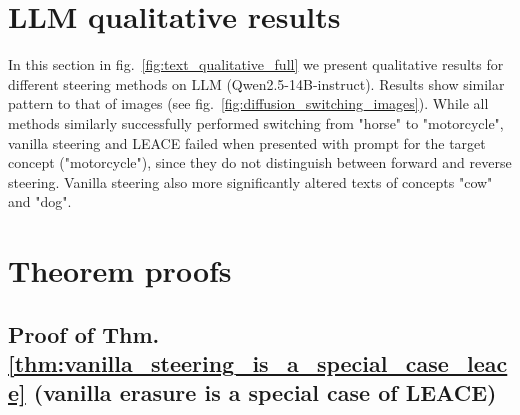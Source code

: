 \clearpage
\section{LLM qualitative results}
In this section in fig.~\ref{fig:text_qualitative_full} we present qualitative results for different steering methods on LLM (Qwen2.5-14B-instruct). Results show similar pattern to that of images (see fig.~\ref{fig:diffusion_switching_images}). While all methods similarly successfully performed switching from "horse" to "motorcycle", vanilla steering and LEACE failed when presented with prompt for the target concept ("motorcycle"), since they do not distinguish between forward and reverse steering. Vanilla steering also more significantly altered texts of concepts "cow" and "dog". 


\clearpage
\section{Theorem proofs}


\subsection{Proof of Thm. \ref{thm:vanilla_steering_is_a_special_case_leace} (vanilla erasure is a special case of LEACE)}

\label{proof:vanilla_erasure_is_special_case_of_LEACE}

